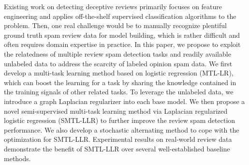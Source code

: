 Existing work on detecting deceptive reviews primarily focuses on feature engineering and applies off-the-shelf supervised classification algorithms to the problem. Then, one real challenge would be to manually recognize plentiful ground truth spam review data for model building, which is rather difficult and often requires domain expertise in practice. In this paper, we propose to exploit the relatedness of multiple review spam detection tasks and readily available unlabeled data to address the scarcity of labeled opinion spam data. We first develop a multi-task learning method based on logistic regression (MTL-LR), which can boost the learning for a task by sharing the knowledge contained in the training signals of other related tasks. To leverage the unlabeled data, we introduce a graph Laplacian regularizer into each base model. We then propose a novel semi-supervised multi-task learning method via Laplacian regularized logistic regression (SMTL-LLR) to further improve the review spam detection performance. We also develop a stochastic alternating method to cope with the optimization for SMTL-LLR. Experimental results on real-world review data demonstrate the benefit of SMTL-LLR over several well-established baseline methods.
